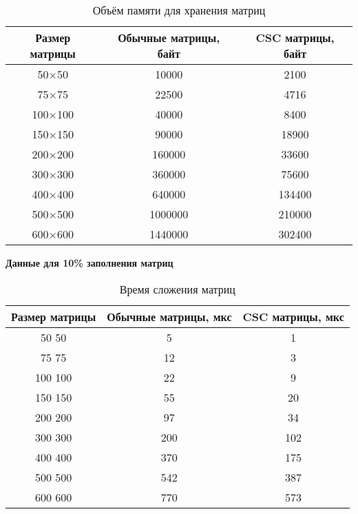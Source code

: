 \begin{table}[H]
	\centering
	\caption{Объём памяти для хранения матриц}
	\begin{tabular}{|c|c|c|}
		\hline
		Размер матрицы & Обычные матрицы, байт & CSC матрицы, байт \\ \hline
		50$\times$50         & 10000                 & 2100             \\ \hline
		75$\times$75         & 22500                 & 4716             \\ \hline
		100$\times$100        & 40000                 & 8400             \\ \hline
		150$\times$150        & 90000                 & 18900            \\ \hline
		200$\times$200        & 160000                & 33600            \\ \hline
		300$\times$300        & 360000                & 75600            \\ \hline
		400$\times$400        & 640000                & 134400           \\ \hline
		500$\times$500        & 1000000               & 210000           \\ \hline
		600$\times$600        & 1440000               & 302400           \\ \hline
	\end{tabular}
\end{table}

\textbf{Данные для 10\% заполнения матриц}
\begin{table}[H]
	\centering
	\caption{Время сложения матриц}
	\begin{tabular}{|c|c|c|}
		\hline
		Размер матрицы & Обычные матрицы, мкс & CSC матрицы, мкс \\ \hline
		50  50         & 5                    & 1                \\ \hline
		75  75         & 12                   & 3                \\ \hline
		100 100        & 22                   & 9                \\ \hline
		150 150        & 55                   & 20               \\ \hline
		200 200        & 97                   & 34               \\ \hline
		300 300        & 200                  & 102              \\ \hline
		400 400        & 370                  & 175              \\ \hline
		500 500        & 542                  & 387              \\ \hline
		600 600        & 770                  & 573              \\ \hline
	\end{tabular}
\end{table}

